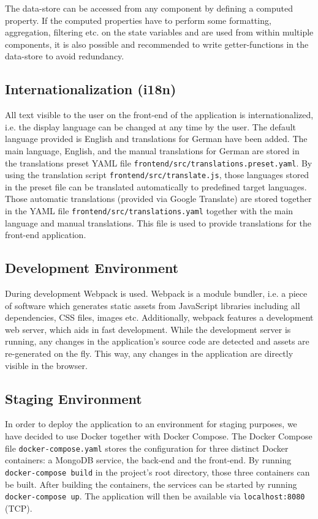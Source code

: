 The data-store can be accessed from any component by defining a computed property. If the computed properties have to perform some formatting, aggregation, filtering etc. on the state variables and are used from within multiple components, it is also possible and recommended to write getter-functions in the data-store to avoid redundancy.

\subsection{Internationalization (i18n)}

All text visible to the user on the front-end of the application is internationalized, i.e. the display language can be changed at any time by the user. The default language provided is English and translations for German have been added. The main language, English, and the manual translations for German are stored in the translations preset YAML file \texttt{frontend/src/translations.preset.yaml}. By using the translation script \texttt{frontend/src/translate.js}, those languages stored in the preset file can be translated automatically to predefined target languages. Those automatic translations (provided via Google Translate) are stored together in the YAML file \texttt{frontend/src/translations.yaml} together with the main language and manual translations. This file is used to provide translations for the front-end application. 


\subsection{Development Environment}
During development Webpack is used. Webpack is a module bundler, i.e. a piece of software which generates static assets from JavaScript libraries including all dependencies, CSS files, images etc. Additionally, webpack features a development web server, which aids in fast development. While the development server is running, any changes in the application's source code are detected and assets are re-generated on the fly. This way, any changes in the application are directly visible in the browser.


\subsection{Staging Environment}
In order to deploy the application to an environment for staging purposes, we have decided to use Docker together with Docker Compose. The Docker Compose file \texttt{docker-compose.yaml} stores the configuration for three distinct Docker containers: a MongoDB service, the back-end and the front-end. By running \texttt{docker-compose build} in the project's root directory, those three containers can be built. After building the containers, the services can be started by running \texttt{docker-compose up}. The application will then be available via \texttt{localhost:8080} (TCP).

